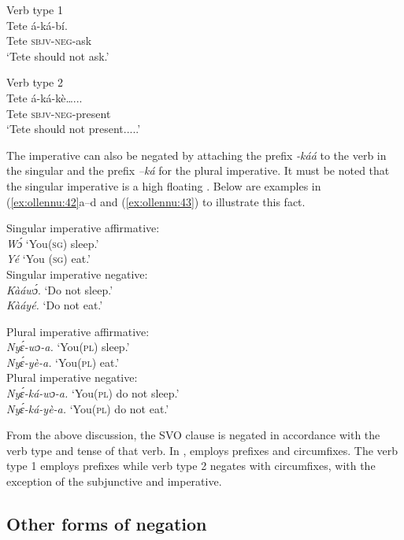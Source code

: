 \documentclass[output=paper,newtxmath,modfonts,nonflat,hidelinks]{langsci/langscibook}
\begin{document}
\ea  Verb type 1 \\\label{ex:ollennu:40}
\gll Tete á-ká-bí.\\
Tete \textsc{sbjv}-\textsc{neg}-ask\\
\glt `Tete should not ask.'
\z






\ea  Verb type 2 \\\label{ex:ollennu:41}
\gll Tete á-ká-kè…...\\
Tete \textsc{sbjv}-\textsc{neg}-present\\
\glt `Tete should not present.....'
\z


The imperative can also be negated by attaching the prefix \textit{-káá} to the verb in the singular and the prefix \textit{–ká} for the plural imperative. It must be noted that the singular imperative is a high floating . Below are examples in (\ref{ex:ollennu:42}a--d and (\ref{ex:ollennu:43}) to illustrate this fact.

\ea \label{ex:ollennu:42}
Singular imperative affirmative:\\
\ea \textit{W\'ɔ}   `You(\textsc{sg}) sleep.' \\
\ex \textit{Yé}  `You (\textsc{sg}) eat.'\\
Singular imperative negative:\\
\ex \textit{Kàáw\'ɔ}.  `Do not sleep.' \\
\ex \textit{Kàáyé.}  `Do not eat.'
\z
\z

\ea \label{ex:ollennu:43} Plural imperative affirmative:\\
\ea \textit{Ny\'ɛ-wɔ-a.}  `You(\textsc{pl}) sleep.'\\
\ex  \textit{Ny\'ɛ-yè-a.}  `You(\textsc{pl}) eat.'\\
Plural imperative negative:\\
\ex \textit{Ny\'ɛ-ká-wɔ-a.}  `You(\textsc{pl}) do not sleep.' \\
\ex \textit{Ny\'ɛ-ká-yè-a.}  `You(\textsc{pl}) do not eat.'
\z
\z

From the above discussion, the SVO clause is negated in accordance with the verb type and tense of that verb. In ,  employs prefixes and circumfixes. The verb type 1 employs prefixes while verb type 2 negates with circumfixes, with the exception of the subjunctive and imperative.

\subsection{\label{sec:ollennu:2.4} Other forms of negation}
\end{document}
